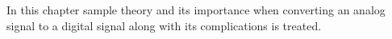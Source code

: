In this chapter sample theory and its importance when converting an analog signal to a digital signal along with its complications is treated.
